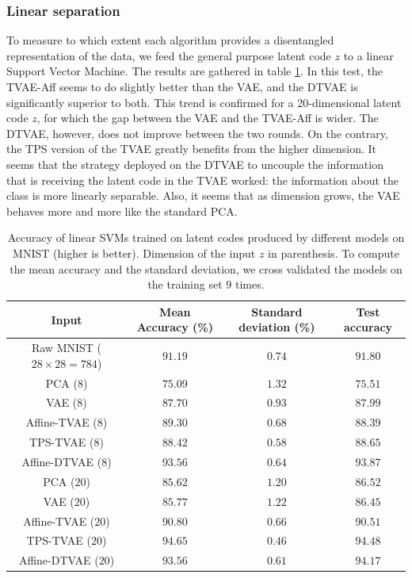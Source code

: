 \documentclass[letterpaper, twoside]{article}
\begin{document}
    \subsubsection{Linear separation}
      To measure to which extent each algorithm provides a disentangled representation of the data, we feed the general purpose latent code $z$ to a linear Support Vector Machine. The results are gathered in table \ref{svmcompar}. In this test, the TVAE-Aff seems to do slightly better than the VAE, and the DTVAE is significantly superior to both. This trend is confirmed for a 20-dimensional latent code $z$, for which the gap between the VAE and the TVAE-Aff is wider. The DTVAE, however, does not improve between the two rounds. On the contrary, the TPS version of the TVAE greatly benefits from the higher dimension. It seems that the strategy deployed on the DTVAE to uncouple the information that is receiving the latent code in the TVAE worked: the information about the class is more linearly separable. Also, it seems that as dimension grows, the VAE behaves more and more like the standard PCA.\\


      \begin{table}[h]
        \centering
        \begin{tabular}{ | c || c | c | c |}
          \hline
          Input & Mean Accuracy (\%) & Standard deviation (\%) & Test accuracy\\ \hline \hline
          Raw MNIST ($28 \times 28 = 784$) & $91.19$ & $0.74$ & $91.80$\\ \hline \hline
          PCA ($8$) & $75.09$ & $1.32$ & $75.51$\\ \hline
          VAE ($8$) & $87.70$ & $0.93$ & $87.99$\\ \hline
          Affine-TVAE ($8$) & $89.30$ & $0.68$ & $88.39$\\ \hline
          TPS-TVAE ($8$) & $88.42$ & $0.58$ & $88.65$\\ \hline
          Affine-DTVAE ($8$) & $\mathbf{93.56}$ & $0.64$ & $\mathbf{93.87}$\\ \hline \hline
          PCA ($20$) & $85.62$ & $1.20$ & $86.52$\\ \hline
          VAE ($20$) & $85.77$ & $1.22$ & $86.45$\\ \hline
          Affine-TVAE ($20$) & $90.80$ & $0.66$ & $90.51$\\ \hline
          TPS-TVAE ($20$) & $\mathbf{94.65}$ & $0.46$& $\mathbf{94.48}$\\ \hline
          Affine-DTVAE ($20$) & $\mathbf{93.56}$ & $0.61$ & $\mathbf{94.17}$\\ \hline 

        \end{tabular}
        \caption{Accuracy of linear SVMs trained on latent codes produced by different models on MNIST (higher is better). Dimension of the input $z$ in parenthesis. To compute the mean accuracy and the standard deviation, we cross validated the models on the training set $9$ times.}
        \label{svmcompar}
      \end{table}
\end{document}
